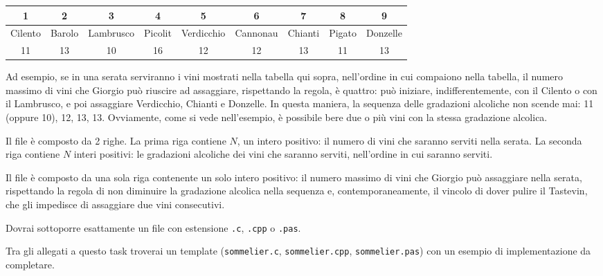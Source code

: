 \begin{tabular}{|c|c|c|c|c|c|c|c|c|}
\hline 1 & 2 & 3 & 4 & 5 & 6 & 7 & 8 & 9 \\
\hline Cilento & Barolo & Lambrusco & Picolit & Verdicchio & Cannonau & Chianti & Pigato & Donzelle \\ 
\hline 11 & 13 & 10 & 16 & 12 & 12 & 13 & 11 & 13\\
\hline
\end{tabular}

Ad esempio, se in una serata serviranno i vini mostrati nella tabella qui sopra, nell’ordine in cui compaiono nella tabella,  il numero massimo di vini che Giorgio può riuscire ad assaggiare, rispettando la regola, è quattro: può iniziare, indifferentemente, con il Cilento o con il Lambrusco, e poi assaggiare Verdicchio, Chianti e Donzelle. In questa maniera, la sequenza delle gradazioni alcoliche non scende mai: 11 (oppure 10), 12, 13, 13. Ovviamente, come si vede nell’esempio, è possibile bere due o più vini con la stessa gradazione alcolica.

\InputFile
Il file  è composto da 2 righe. La prima riga contiene $N$, un intero positivo: il numero di vini che saranno serviti nella serata. La seconda riga contiene $N$ interi positivi: le gradazioni alcoliche dei vini che saranno serviti, nell’ordine in cui saranno serviti.

\OutputFile
Il file \outputfile{} è composto da una sola riga contenente un solo intero positivo: il numero massimo di vini che Giorgio può assaggiare nella serata, rispettando la regola di non diminuire la gradazione alcolica nella sequenza e, contemporaneamente, il vincolo di dover pulire il Tastevin, che gli impedisce di assaggiare due vini consecutivi.

\pagebreak
\Implementation
Dovrai sottoporre esattamente un file con estensione \texttt{.c}, \texttt{.cpp} o \texttt{.pas}.

\begin{warning}
Tra gli allegati a questo task troverai un template (\texttt{sommelier.c}, \texttt{sommelier.cpp}, \texttt{sommelier.pas}) con un esempio di implementazione da completare.
\end{warning}

